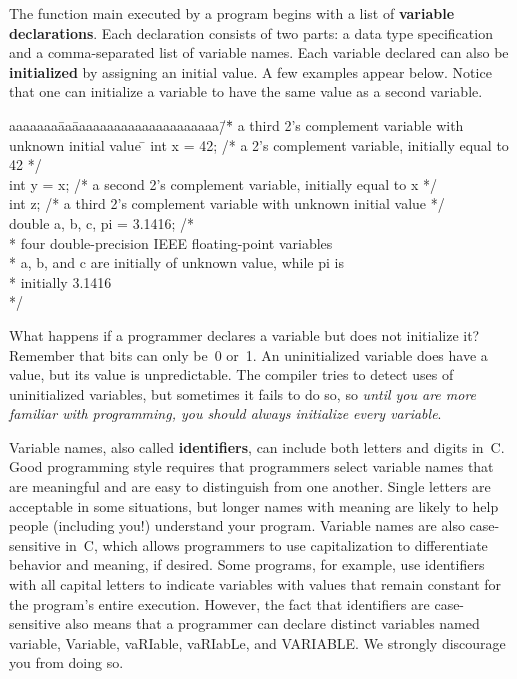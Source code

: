 The function {\tfix main} executed by a program begins with a list
of {\bf variable declarations}.  Each declaration consists of two parts:
a data type specification and a comma-separated list of variable names.
Each variable declared can also 
be {\bf initialized} by assigning an initial value.  A few examples 
appear below.  Notice that one can initialize a variable to have the same
value as a second variable.

{\fix
\begin{tabbing}
aaaaaaa\=aa\=aaaaaaaaaaaaaaaaaaaaa\=/\=* a third 2's complement variable with unknown initial value \=\kill
int \> x \> = 42; \>/\>* a 2's complement variable, initially equal to 42 \> */\\
int \> y \> = x;  \>/\>* a second 2's complement variable, initially equal to x \> */\\
int \> z;\>       \>/\>* a third 2's complement variable with unknown initial value \> */\\
double\> a, b, c, pi = 3.1416; \> \>/\>*\\
\>\>\>\>* four double-precision IEEE floating-point variables\\
\>\>\>\>* a, b, and c are initially of unknown value, while pi is\\
\>\>\>\>* initially 3.1416\\
\>\>\>\>*/
\end{tabbing}
}

What happens if a programmer declares a variable but does not 
initialize it?
%
Remember that bits can only be~0 or~1.
%
An uninitialized variable does have a value, but its value is unpredictable.
%
The compiler tries to detect uses of uninitialized variables, but sometimes
it fails to do so, so {\it until you are more familiar with programming,
you should always initialize every variable}.

Variable names, also called {\bf identifiers}, can include both letters
and digits in~C.
%
Good programming style requires that programmers select variable names
that are meaningful and are easy to distinguish from one another.
%
Single letters are acceptable in some situations, but longer names with
meaning are likely to help people (including you!) understand your 
program.
%
Variable names are also case-sensitive in~C, which allows programmers
to use capitalization to differentiate behavior and meaning, if desired.
Some programs, for example, use identifiers with all capital letters
to indicate variables with values that remain constant for the program's
entire execution.
%
However, the fact that identifiers are case-sensitive also means 
that a programmer can declare distinct variables 
named {\tfix variable}, {\tfix Variable}, {\tfix vaRIable}, {\tfix vaRIabLe}, 
and {\tfix VARIABLE}.  We strongly discourage you from doing so.\\




